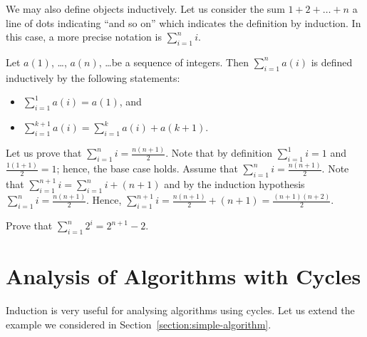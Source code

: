 We may also define objects inductively. Let us consider the sum
$1 + 2 + \dots + n$ a line of dots indicating ``and so on'' which indicates the
definition by induction. In this case, a more precise notation is
$\sum_{i = 1}^n i$.

\begin{definition}
    Let $a(1)$, \dots, $a(n)$, \dots be a sequence of integers. Then
    $\sum_{i = 1}^n a(i)$ is defined inductively by the following
    statements:
    \begin{itemize}
        \item $\sum_{i = 1}^1 a(i) = a(1)$, and
        \item $\sum_{i = 1}^{k + 1} a(i) =
            \sum_{i = 1}^k a(i) + a(k + 1)$.
    \end{itemize}
\end{definition}

Let us prove that $\sum_{i = 1}^n i = \frac{n (n + 1)}{2}$.
Note that by definition $\sum_{i = 1}^1 i = 1$ and
$\frac{1 (1 + 1)}{2} = 1$; hence, the base case holds. Assume that
$\sum_{i = 1}^n i = \frac{n (n + 1)}{2}$. Note that
$\sum_{i = 1}^{n + 1} i = \sum_{i = 1}^n i + (n + 1)$ and by the
induction hypothesis $\sum_{i = 1}^n i = \frac{n (n + 1)}{2}$.
Hence, $\sum_{i = 1}^{n + 1} i = \frac{n (n + 1)}{2} + (n + 1) =
\frac{(n + 1)(n + 2)}{2}$.

\begin{exercise}
    Prove that $\sum_{i = 1}^n 2^i = 2^{n + 1} - 2$.
\end{exercise}

\section{Analysis of Algorithms with Cycles}

Induction is very useful for analysing algorithms using cycles. Let us extend
the example we considered in Section~\ref{section:simple-algorithm}.

